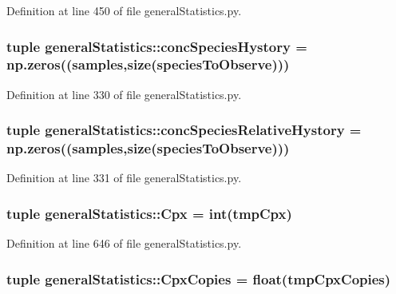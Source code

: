 \-Definition at line 450 of file general\-Statistics.\-py.

\hypertarget{namespacegeneral_statistics_a900d9e27b938468e0d244dbb49d7111c}{
\subsubsection[{conc\-Species\-Hystory}]{\setlength{\rightskip}{0pt plus 5cm}tuple {\bf general\-Statistics\-::conc\-Species\-Hystory} = np.\-zeros(({\bf samples},{\bf size}({\bf species\-To\-Observe})))}}\label{namespacegeneral_statistics_a900d9e27b938468e0d244dbb49d7111c}


\-Definition at line 330 of file general\-Statistics.\-py.

\hypertarget{namespacegeneral_statistics_ae67f4c2cba55845d070f6b0c783ad6fb}{
\subsubsection[{conc\-Species\-Relative\-Hystory}]{\setlength{\rightskip}{0pt plus 5cm}tuple {\bf general\-Statistics\-::conc\-Species\-Relative\-Hystory} = np.\-zeros(({\bf samples},{\bf size}({\bf species\-To\-Observe})))}}\label{namespacegeneral_statistics_ae67f4c2cba55845d070f6b0c783ad6fb}


\-Definition at line 331 of file general\-Statistics.\-py.

\hypertarget{namespacegeneral_statistics_a01c3b02ff04ff7cd0ac095d94ce2158c}{
\subsubsection[{\-Cpx}]{\setlength{\rightskip}{0pt plus 5cm}tuple {\bf general\-Statistics\-::\-Cpx} = int(tmp\-Cpx)}}\label{namespacegeneral_statistics_a01c3b02ff04ff7cd0ac095d94ce2158c}


\-Definition at line 646 of file general\-Statistics.\-py.

\hypertarget{namespacegeneral_statistics_ab0724b4ad6530b45535743fb7939fd5a}{
\subsubsection[{\-Cpx\-Copies}]{\setlength{\rightskip}{0pt plus 5cm}tuple {\bf general\-Statistics\-::\-Cpx\-Copies} = float(tmp\-Cpx\-Copies)}}\label{namespacegeneral_statistics_ab0724b4ad6530b45535743fb7939fd5a}


